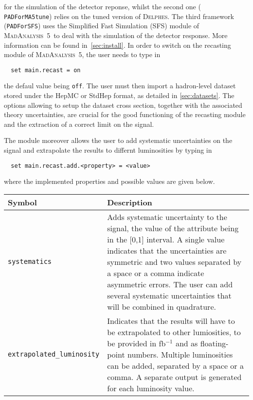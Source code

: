 \documentclass[a4paper]{article}
\newcommand{\MA}{\textsc{MadAnalysis}~5}
\newcommand{\DEL}{\textsc{Delphes}}
\begin{document}
for the simulation of the detector reponse, whilst the second one ({\tt
PADForMA5tune}) relies on the
tuned version of \DEL. The third framework ({\tt PADForSFS}) uses the Simplified
Fast Simulation (SFS) module of \MA\ to deal with the simulation of the
detector response. More information can be found in~\autoref{sec:install}.
In order to switch on the recasting module of \MA, the user needs to type in
{\color{ao} \begin{verbatim}
  set main.recast = on
\end{verbatim}}
\noindent the defaul value being \verb|off|. The user must then import a
hadron-level dataset stored under the HepMC or StdHep format, as detailed in
\autoref{sec:datasets}. The options allowing to setup the dataset cross section,
together with the associated theory uncertainties, are crucial for
the good functioning of the recasting module and the extraction of a correct
limit on the signal.

\noindent The module moreover allows the user to add systematic uncertainties on
the signal and extrapolate the results to differnt luminosities by typing in
{\color{ao} \begin{verbatim}
  set main.recast.add.<property> = <value>
\end{verbatim}}
\noindent where the implemented properties and possible values are given below.
\renewcommand{\arraystretch}{1.2}%
\begin{center}\begin{tabular}{l p{8.4cm}}
\hline
  Symbol& Description\\
  \hline
  \color{ao} \verb?systematics? & Adds systematic uncertainty to the signal, the
    value of the attribute being in the [0,1] interval. A single value indicates
    that the uncertainties are symmetric and two values separated by a space or
    a comma indicate asymmetric errors. The user can add several systematic
    uncertainties that will be combined in quadrature. \\
  \color{ao} \verb?extrapolated_luminosity?  & Indicates that the results will
    have to be extrapolated to other lumiosities, to be provided in fb$^{-1}$
    and as floating-point numbers. Multiple luminosities can be added, separated
    by a space or a comma. A separate output is generated for each luminosity
    value.\\
  \hline
\end{tabular}
\end{center}
\end{document}
